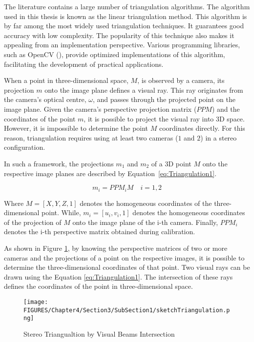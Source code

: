 The literature contains a large number of triangulation algorithms. The algorithm used in this thesis is known as the linear triangulation method. This algorithm is by far among the most widely used triangulation techniques. It guarantees good accuracy with low complexity.
The popularity of this technique also makes it appealing from an implementation perspective. Various programming libraries, such as OpenCV (\cite{opencv_website}), provide optimized implementations of this algorithm, facilitating the development of practical applications.

When a point in three-dimensional space, $M$, is observed by a camera, its projection $m$ onto the image plane defines a visual ray. This ray originates from the camera's optical centre, $\omega$, and passes through the projected point on the image plane. 
Given the camera's perspective projection matrix ($PPM$) and the coordinates of the point $m$, it is possible to project the visual ray into 3D space. However, it is impossible to determine the point $M$ coordinates directly. For this reason, triangulation requires using at least two cameras ($1$ and $2$) in a stereo configuration. 

In such a framework, the projections $m_1$ and $m_2$ of a 3D point $M$ onto the respective image planes are described by Equation~\ref{eq:Triangulation1}.

\begin{equation}
  m_i = PPM_i M \quad i = 1,2
  \label{eq:Triangulation1}
\end{equation}

Where $M = [X, Y, Z, 1]$ denotes the homogeneous coordinates of the three-dimensional point. While, $m_i = [u_i, v_i, 1]$ denotes the homogeneous coordinates of the projection of $M$ onto the image plane of the i-th camera. Finally, $PPM_i$ denotes the i-th perspective matrix obtained during calibration.

As shown in Figure \ref{fig:sketchTriangulation}, by knowing the perspective matrices of two or more cameras and the projections of a point on the respective images, it is possible to determine the three-dimensional coordinates of that point. Two visual rays can be drawn using the Equation \ref{eq:Triangulation1}.
The intersection of these rays defines the coordinates of the point in three-dimensional space.

\begin{figure}[!h]
  \centering
  \texttt{[image: FIGURES/Chapter4/Section3/SubSection1/sketchTriangulation.png]}
  \caption{Stereo Triangualtion by Visual Beams Intersection}
  \label{fig:sketchTriangulation}  
\end{figure}

